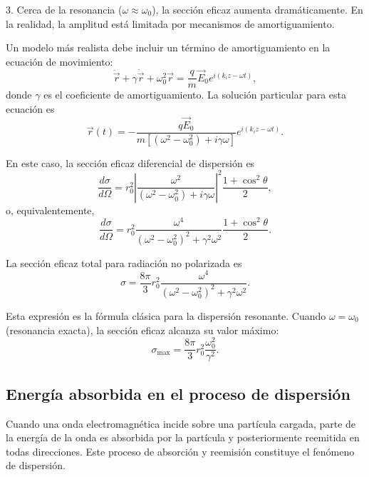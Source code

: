 \documentclass[12pt,a4paper]{book}
\begin{document}
3. Cerca de la resonancia ($\omega \approx \omega_0$), la sección eficaz aumenta dramáticamente. En la realidad, la amplitud está limitada por mecanismos de amortiguamiento.

Un modelo más realista debe incluir un término de amortiguamiento en la ecuación de movimiento:
\begin{equation}
\ddot{\vec{r}} + \gamma\dot{\vec{r}} + \omega_0^2\vec{r} = \frac{q}{m}\vec{E}_0e^{i(k_iz-\omega t)},
\end{equation}
donde $\gamma$ es el coeficiente de amortiguamiento. La solución particular para esta ecuación es
\begin{equation}
\vec{r}(t) = -\frac{q\vec{E}_0}{m[(\omega^2-\omega_0^2) + i\gamma\omega]}e^{i(k_iz-\omega t)}.
\end{equation}

En este caso, la sección eficaz diferencial de dispersión es
\begin{equation}
\frac{d\sigma}{d\Omega} = r_0^2\left|\frac{\omega^2}{(\omega^2-\omega_0^2) + i\gamma\omega}\right|^2\frac{1 + \cos^2\theta}{2},
\end{equation}
o, equivalentemente,
\begin{equation}
\frac{d\sigma}{d\Omega} = r_0^2\frac{\omega^4}{(\omega^2-\omega_0^2)^2 + \gamma^2\omega^2}\frac{1 + \cos^2\theta}{2}.
\end{equation}

La sección eficaz total para radiación no polarizada es
\begin{equation}
\sigma = \frac{8\pi}{3}r_0^2\frac{\omega^4}{(\omega^2-\omega_0^2)^2 + \gamma^2\omega^2}.
\end{equation}

Esta expresión es la fórmula clásica para la dispersión resonante. Cuando $\omega = \omega_0$ (resonancia exacta), la sección eficaz alcanza su valor máximo:
\begin{equation}
\sigma_{\text{max}} = \frac{8\pi}{3}r_0^2\frac{\omega_0^2}{\gamma^2}.
\end{equation}

\subsection{Energía absorbida en el proceso de dispersión}

Cuando una onda electromagnética incide sobre una partícula cargada, parte de la energía de la onda es absorbida por la partícula y posteriormente reemitida en todas direcciones. Este proceso de absorción y reemisión constituye el fenómeno de dispersión.
\end{document}
